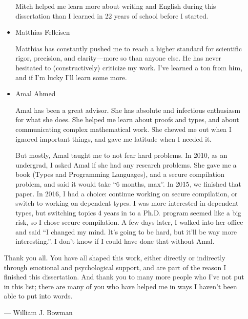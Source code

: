 \begin{itemize}
  Mitch helped me learn more about writing and English during this dissertation
  than I learned in 22 years of school before I started.
\item Matthias Felleisen

  Matthias has constantly pushed me to reach a higher standard for scientific
  rigor, precision, and clarity---more so than anyone else.
  He has never hesitated to (constructively) criticize my work.
  I've learned a ton from him, and if I'm lucky I'll learn some more.
\item Amal Ahmed

  Amal has been a great advisor.
  She has absolute and infectious enthusiasm for what she does.
  She helped me learn about proofs and types, and about communicating complex
  mathematical work.
  She chewed me out when I ignored important things, and gave me latitude
  when I needed it.

  But mostly, Amal taught me to not fear hard problems.
  In 2010, as an undergrad, I asked Amal if she had any research problems.
  She gave me a book (Types and Programming Languages), and a secure compilation
  problem, and said it would take ``6 months, max''.
  In 2015, we finished that paper.
  In 2016, I had a choice: continue working on secure compilation, or switch to
  working on dependent types.
  I was more interested in dependent types, but switching topics 4 years in to a
  Ph.D. program seemed like a big risk, so I chose secure compilation.
  A few days later, I walked into her office and said ``I changed my mind. It's
  going to be hard, but it'll be way more interesting.''.
  I don't know if I could have done that without Amal.
\end{itemize}

\bigskip

\noindent Thank you all. You have all shaped this work, either directly or indirectly through emotional and psychological support, and are part of the reason I finished this dissertation. And thank you to many more people who I've not put in this list; there are many of you who have helped me in ways I haven't been able to put into words.

\hfill --- William J. Bowman
\endgroup
